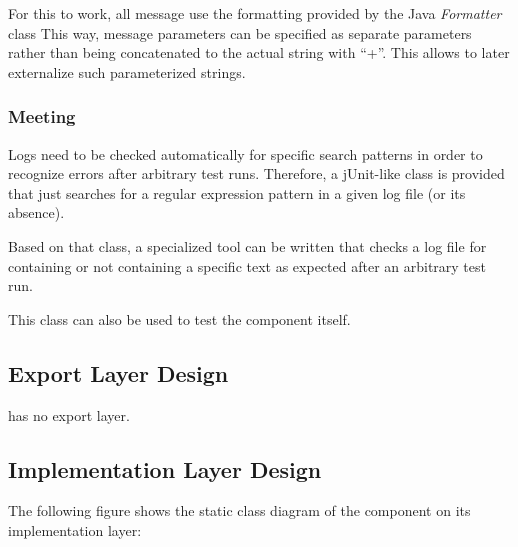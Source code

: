 For this to work, all message use the formatting provided by the Java \emph{Formatter} class This way, message parameters can be specified as separate parameters rather than being concatenated to the actual string with ``+''. This allows to later externalize such parameterized strings.


\subsubsection{Meeting \REQUlogTestability{}}
\label{sec:MeetingREQUlogTestability}

Logs need to be checked automatically for specific search patterns in order to recognize errors after arbitrary test runs. Therefore, a jUnit-like class is provided that just searches for a regular expression pattern in a given log file (or its absence).

Based on that class, a specialized tool can be written that checks a log file for containing or not containing a specific text as expected after an arbitrary test run.

This class can also be used to test the \COMPlogging{} component itself.


\subsection{Export Layer Design}
\label{sec:ExportDesignCOMPlogging}

\COMPlogging{} has no export layer.


\subsection{Implementation Layer Design}
\label{sec:ImplementationDesignCOMPlogging}

The following figure shows the static class diagram of the component \COMPlogging{} on its implementation layer:

